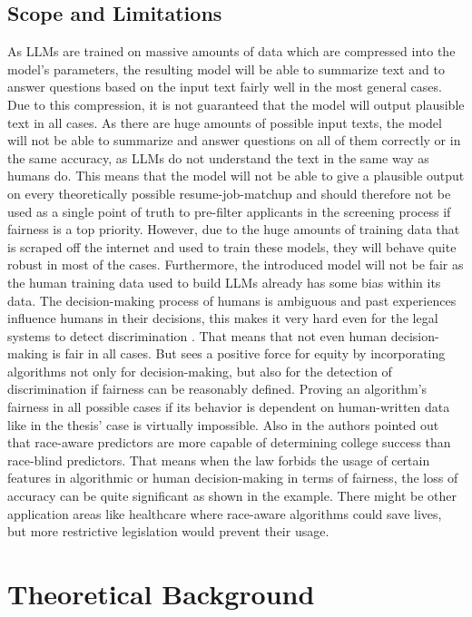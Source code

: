 \documentclass[draft,final]{thesisclass} %
\begin{document}
\section{Scope and Limitations}
As \acs{LLM}s are trained on massive amounts of data which are compressed into the model's parameters, the resulting model will be able to summarize text and to answer questions based on the input text fairly well in the most general cases.
Due to this compression, it is not guaranteed that the model will output plausible text in all cases. 
As there are huge amounts of possible input texts, the model will not be able to summarize and answer questions on all of them correctly or in the same accuracy, as \acs{LLM}s do not understand the text in the same way as humans do.
This means that the model will not be able to give a plausible output on every theoretically possible resume-job-matchup and should therefore not be used as a single point of truth to pre-filter applicants in the screening process if fairness is a top priority.
However, due to the huge amounts of training data that is scraped off the internet and used to train these models, they will behave quite robust in most of the cases.
Furthermore, the introduced model will not be fair as the human training data used to build \acs{LLM}s already has some bias within its data. The decision-making process of humans is ambiguous and past experiences influence humans in their decisions, this makes it very hard even for the legal systems to detect discrimination \cite[113]{discrimination_algorithms}. That means that not even human decision-making is fair in all cases. But \cite[113]{discrimination_algorithms} sees a positive force for equity by incorporating algorithms not only for decision-making, but also for the detection of discrimination if fairness can be reasonably defined. Proving an algorithm's fairness in all possible cases if its behavior is dependent on human-written data like in the thesis' case is virtually impossible. Also in \cite[158-160]{discrimination_algorithms} the authors pointed out that race-aware predictors are more capable of determining college success than race-blind predictors.
That means when the law forbids the usage of certain features in algorithmic or human decision-making in terms of fairness, the loss of accuracy can be quite significant as shown in the example. There might be other application areas like healthcare where race-aware algorithms could save lives, but more restrictive legislation would prevent their usage.

\chapter{Theoretical Background}
\end{document}

